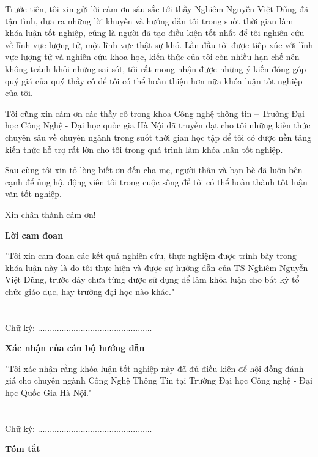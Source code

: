 \documentclass[13pt, a4paper]{report}
\begin{document}
Trước tiên, tôi xin gửi lời cảm ơn sâu sắc tới thầy Nghiêm Nguyễn Việt Dũng đã tận tình, đưa ra những lời khuyên và hướng dẫn tôi trong suốt thời gian làm khóa luận tốt nghiệp, cũng là người đã tạo điều kiện tốt nhất để tôi nghiên cứu về lĩnh vực lượng tử, một lĩnh vực thật sự khó. Lần đầu tôi được tiếp xúc với lĩnh vực lượng tử và nghiên cứu khoa học, kiến thức của tôi còn nhiều hạn chế nên không tránh khỏi những sai sót, tôi rất mong nhận được những ý kiến đóng góp quý giá của quý thầy cô để tôi có thể hoàn thiện hơn nữa khóa luận tốt nghiệp của tôi.

Tôi cũng xin cảm ơn các thầy cô trong khoa Công nghệ thông tin – Trường Đại
học Công Nghệ - Đại học quốc gia Hà Nội đã truyền đạt cho tôi những kiến thức
chuyên sâu về chuyên ngành trong suốt thời gian học tập để tôi có được nền tảng
kiến thức hỗ trợ rất lớn cho tôi trong quá trình làm khóa luận tốt nghiệp.

Sau cùng tôi xin tỏ lòng biết ơn đến cha mẹ, người thân và bạn bè đã luôn bên
cạnh để ủng hộ, động viên tôi trong cuộc sống để tôi có thể hoàn thành tốt luận
văn tốt nghiệp.

Xin chân thành cảm ơn! 


\newpage
\thispagestyle{empty}
\centerline{\huge{\textbf{Lời cam đoan}}}

"Tôi xin cam đoan các kết quả nghiên cứu, thực nghiệm được trình bày trong khóa luận này là do tôi thực hiện và được sự hướng dẫn của TS Nghiêm Nguyễn Việt Dũng, trước đây
chưa từng được sử dụng để làm khóa luận cho bất kỳ tổ chức giáo dục, hay trường
đại học nào khác."
\\
\\
\\
Chữ ký: ................................................

\newpage
\thispagestyle{empty}
\centerline{\huge{\textbf{Xác nhận của cán bộ hướng dẫn}}}

"Tôi xác nhận rằng khóa luận tốt nghiệp này đã đủ điều kiện để hội đồng đánh giá cho
chuyên ngành Công Nghệ Thông Tin tại Trường Đại học Công nghệ - Đại học Quốc Gia
Hà Nội."
\\
\\
\\
Chữ ký: ................................................

\newpage

\centerline{\textbf{Tóm tắt}}
\thispagestyle{empty}
\end{document}
